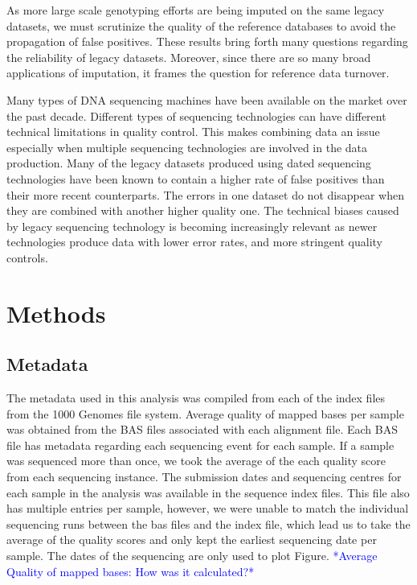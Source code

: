 \documentclass[9pt,lineno]{elife}
\newcommand{\todo}[1]{\textcolor{blue}{*#1*}}
\begin{document}
As more large scale genotyping efforts are being imputed on the same legacy datasets, we must scrutinize the quality of the reference databases to avoid the propagation of false positives. 
These results bring forth many questions regarding the reliability of legacy datasets. 
Moreover, since there are so many broad applications of imputation, it frames the question for reference data turnover. 

Many types of DNA sequencing machines have been available on the market over the past decade.
Different types of sequencing technologies can have different technical limitations in quality control.
This makes combining data an issue especially when multiple sequencing technologies are involved in the data production.
Many of the legacy datasets produced using dated sequencing technologies have been known to contain a higher rate of false positives than their more recent counterparts.
The errors in one dataset do not disappear when they are combined with another higher quality one.
The technical biases caused by legacy sequencing technology is becoming increasingly relevant as newer technologies produce data with lower error rates, and more stringent quality controls.




\section{Methods}
\subsection{Metadata}
The metadata used in this analysis was compiled from each of the index files from the 1000 Genomes file system. 
Average quality of mapped bases per sample was obtained from the BAS files associated with each alignment file. 
Each BAS file has metadata regarding each sequencing event for each sample. 
If a sample was sequenced more than once, we took the average of the each quality score from each sequencing instance. 
The submission dates and sequencing centres for each sample in the analysis was available in the sequence index files.  
This file also has multiple entries per sample, however, we were unable to match the individual sequencing runs between the bas files and the index file, which lead us to take the average of the quality scores and only kept the earliest sequencing date per sample. 
The dates of the sequencing are only used to plot Figure. \todo{Average Quality of mapped bases: How was it calculated?}
\end{document}
